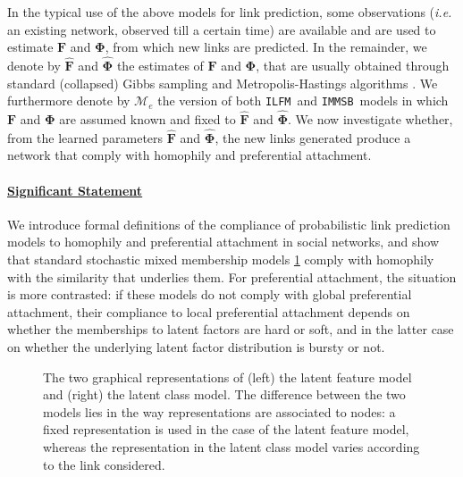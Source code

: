 \documentclass{llncs}
\newcommand*{\lpath}{./}%
\newcommand{\ifm}{\texttt{ILFM}}
\newcommand{\imb}{\texttt{IMMSB}}
\newcommand{\mat}[1]{\mathbf{#1}}
\begin{document}
In the typical use of the above models for link prediction, some observations (\textit{i.e.} an existing network, observed till a certain time) are available and are used to estimate $\mat{F}$ and $\mat{\Phi}$, from which new links are predicted. In the remainder, we denote by $\mat{\hat{F}}$ and $\mat{\hat{\Phi}}$ the estimates of $\mat{F}$ and $\mat{\Phi}$, that are usually obtained through standard (collapsed) Gibbs sampling and Metropolis-Hastings algorithms \cite{ILFRM,IBP,HDP,diMMSB}. We furthermore denote by $\mathcal{M}_e$ the version of both \ifm\ and \imb\ models in which $\mat{F}$ and $\mat{\Phi}$ are assumed known and fixed to $\mat{\hat{F}}$ and $\mat{\hat{\Phi}}$. We now investigate whether, from the learned parameters $\mat{\hat{F}}$ and $\mat{\hat{\Phi}}$, the new links generated produce a network that comply with homophily and preferential attachment.

\paragraph{\underline{Significant Statement}}We introduce formal definitions of the compliance of probabilistic link prediction models to homophily and preferential attachment in social networks, and show that standard stochastic mixed membership models \ref{fig:mmm} comply with homophily with the similarity that underlies them. For preferential attachment, the situation is more contrasted: if these models do not comply with global preferential attachment, their compliance to local preferential attachment depends on whether the memberships to latent factors are hard or soft, and in the latter case on whether the underlying latent factor distribution is bursty or not.

\begin{figure}[t]
	\centering
	\vspace{1cm}
	\scalebox{0.88}{
	}
	\endminipage
	\scalebox{0.88}{
		}
	\endminipage
	\caption{The two graphical representations of (left) the latent feature model and (right) the latent class model. The difference between the two models lies in the way representations are associated to nodes: a fixed representation is used in the case of the latent feature model, whereas the representation in the latent class model varies according to the link considered.}
	\label{fig:mmm}
\end{figure}
\end{document}
